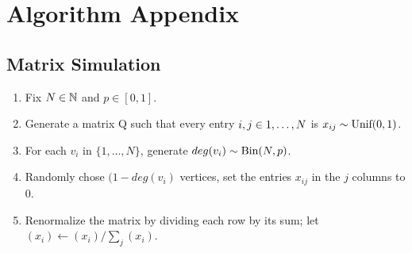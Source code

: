 \chapter{Algorithm Appendix}
\section{Matrix Simulation}
\begin{algorithm} \hfill
\begin{enumerate}
	\item{Fix $N \in \N$ and $p \in [0,1]$}.
	\item{Generate a matrix Q such that every entry $i,j\in \oneto[N]$ is $x_{ij} \sim \Unif(0,1)$.}
	\item{For each $v_i$ in $\{1,\dots,N\}$, generate $deg(v_i) \sim \Bin(N,p)$.}
	\item{Randomly chose $(1-deg(v_i)$ vertices, set the entries $x_{ij}$ in the $j$ columns to 0.}
	\item{Renormalize the matrix by dividing each row by its sum; let $(x_i) \leftarrow (x_i)/\sum_j(x_i)$}.
\end{enumerate}
\end{algorithm}